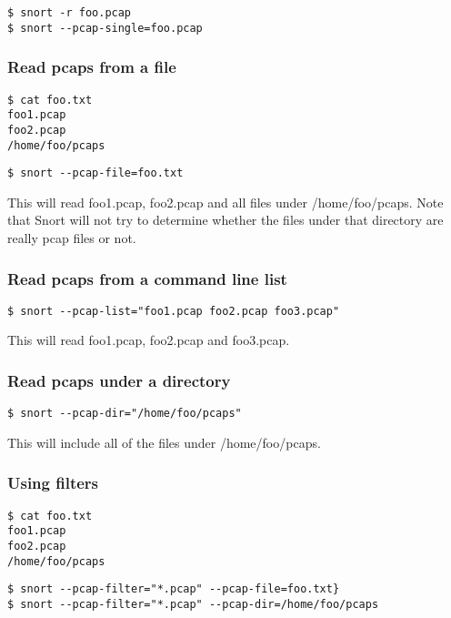 \documentclass[english]{report}
\begin{document}
\begin{verbatim}
$ snort -r foo.pcap
$ snort --pcap-single=foo.pcap
\end{verbatim}

\subsubsection{Read pcaps from a file}

\begin{verbatim}
$ cat foo.txt
foo1.pcap
foo2.pcap
/home/foo/pcaps
\end{verbatim}

\begin{verbatim}
$ snort --pcap-file=foo.txt
\end{verbatim}

This will read foo1.pcap, foo2.pcap and all files under /home/foo/pcaps.
Note that Snort will not try to determine whether the files under that 
directory are really pcap files or not.

\subsubsection{Read pcaps from a command line list}

\begin{verbatim}
$ snort --pcap-list="foo1.pcap foo2.pcap foo3.pcap"
\end{verbatim}

This will read foo1.pcap, foo2.pcap and foo3.pcap.

\subsubsection{Read pcaps under a directory}

\begin{verbatim}
$ snort --pcap-dir="/home/foo/pcaps"
\end{verbatim}

This will include all of the files under /home/foo/pcaps.

\subsubsection{Using filters}

\begin{verbatim}
$ cat foo.txt
foo1.pcap
foo2.pcap
/home/foo/pcaps
\end{verbatim}

\begin{verbatim}
$ snort --pcap-filter="*.pcap" --pcap-file=foo.txt}
$ snort --pcap-filter="*.pcap" --pcap-dir=/home/foo/pcaps
\end{verbatim}
\end{document}
